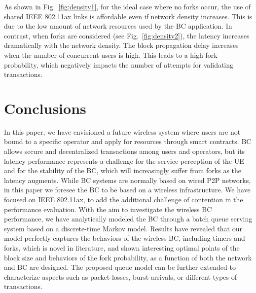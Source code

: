\documentclass[conference]{IEEEtran}
\theoremstyle{definition}
\begin{document}
As shown in Fig.~\ref{fig:density1}, for the ideal case where no forks occur, the use of shared IEEE 802.11ax links is affordable even if network density increases. This is due to the low amount of network resources used by the BC application. In contrast, when forks are considered (see Fig.~\ref{fig:density2}), the latency increases dramatically with the network density. The block propagation delay increases when the number of concurrent users is high. This leads to a high fork probability, which negatively impacts the number of attempts for validating transactions. 

\section{Conclusions}
\label{section:conclusions}
In this paper, we have envisioned a future wireless system where users are not bound to a specific operator and apply for resources through smart contracts. BC allows secure and decentralized transactions among users and operators, but its latency performance represents a challenge for the service perception of the UE and for the stability of the BC, which will increasingly suffer from forks as the latency augments. While BC systems are normally based on wired P2P networks, in this paper we foresee the BC to be based on a wireless infrastructure. We have focused on IEEE 802.11ax, to add the additional challenge of contention in the performance evaluation. With the aim to investigate the wireless BC performance, we have analytically modeled the BC through a batch queue serving system based on a discrete-time Markov model. Results have revealed that our model perfectly captures the behaviors of the wireless BC, including timers and forks, which is novel in literature, and shown interesting optimal points of the block size and behaviors of the fork probability, as a function of both the network and BC are designed. The proposed queue model can be further extended to characterize aspects such as packet losses, burst arrivals, or different types of transactions. %

\ifCLASSOPTIONcaptionsoff
\newpage
\fi



\end{document}
